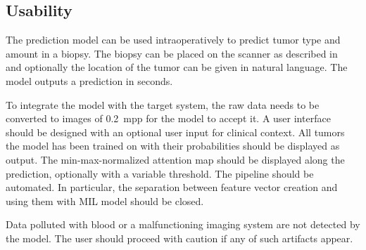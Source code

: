 \subsection{Usability}
The prediction model can be used intraoperatively to predict tumor type and amount in a biopsy.
The biopsy can be placed on the scanner as described in~\cite{Spies2023} and optionally the location of the tumor can be given in natural language.
The model outputs a prediction in seconds.

To integrate the model with the target system, the raw data needs to be converted to images of \qty{0.2}{mpp} for the model to accept it.
A user interface should be designed with an optional user input for clinical context.
All tumors the model has been trained on with their probabilities should be displayed as output.
The min-max-normalized attention map should be displayed along the prediction, optionally with a variable threshold.
The pipeline should be automated.
In particular, the separation between feature vector creation and using them with MIL model should be closed.

Data polluted with blood or a malfunctioning imaging system are not detected by the model.
The user should proceed with caution if any of such artifacts appear.
